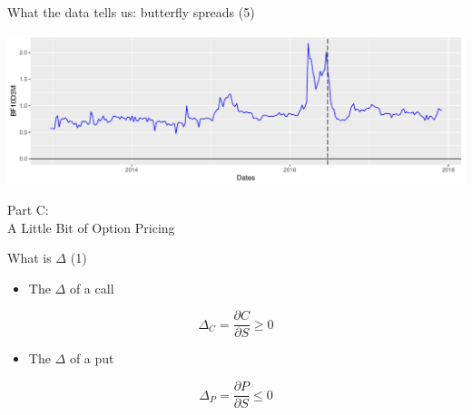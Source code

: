\begin{frame}[fragile]{What the data tells us: butterfly spreads (5)}

\begin{Shaded}
\begin{Highlighting}[]
\StringTok{ }\OperatorTok{+}\StringTok{ }\NormalTok{(}\NormalTok{) }\OperatorTok{+}\StringTok{ }
\StringTok{        }\NormalTok{(}\NormalTok{)}
\StringTok{ }\OperatorTok{+}\StringTok{ }\NormalTok{(}\NormalTok{(}\NormalTok{((}\NormalTok{))),}
                     \NormalTok{)}
\end{Highlighting}
\end{Shaded}

\begin{center}\includegraphics[width=1\linewidth]{2018_02_07_IMF_FXCourse_files/figure-beamer/unnamed-chunk-19-1} \end{center}

\end{frame}

\begin{frame}{}

\color{blue} \LARGE{Part C:}\\
\LARGE{A Little Bit of Option Pricing}

\end{frame}

\begin{frame}{What is \(\Delta\) (1)}

\begin{itemize}
\tightlist
\item
  The \(\Delta\) of a call
\end{itemize}

\[ \Delta_C = \frac{\partial C}{\partial S} \geq 0\]

\begin{itemize}
\tightlist
\item
  The \(\Delta\) of a put
\end{itemize}

\[ \Delta_P = \frac{\partial P}{\partial S} \leq 0\]

\end{frame}

